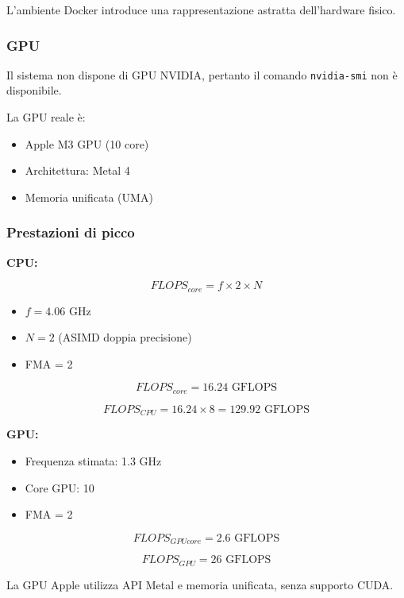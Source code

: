 \documentclass[a4paper,12pt]{article}
\begin{document}
L’ambiente Docker introduce una rappresentazione astratta dell’hardware fisico.

\subsubsection{GPU}

Il sistema non dispone di GPU NVIDIA, pertanto il comando \texttt{nvidia-smi} non è disponibile.

La GPU reale è:

\begin{itemize}
    \item Apple M3 GPU (10 core)
    \item Architettura: Metal 4
    \item Memoria unificata (UMA)
\end{itemize}

\subsubsection{Prestazioni di picco}

\textbf{CPU:}

\[
FLOPS_{core} = f \times 2 \times N
\]

\begin{itemize}
    \item $f = 4.06$ GHz
    \item $N = 2$ (ASIMD doppia precisione)
    \item FMA = 2
\end{itemize}

\[
FLOPS_{core} = 16.24 \text{ GFLOPS}
\]

\[
FLOPS_{CPU} = 16.24 \times 8 = 129.92 \text{ GFLOPS}
\]

\vspace{0.5cm}

\textbf{GPU:}

\begin{itemize}
    \item Frequenza stimata: 1.3 GHz
    \item Core GPU: 10
    \item FMA = 2
\end{itemize}

\[
FLOPS_{GPUcore} = 2.6 \text{ GFLOPS}
\]

\[
FLOPS_{GPU} = 26 \text{ GFLOPS}
\]

La GPU Apple utilizza API Metal e memoria unificata, senza supporto CUDA.
\end{document}
